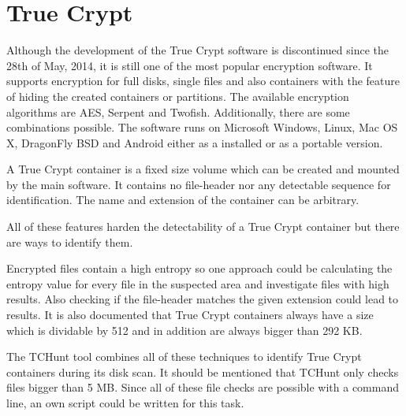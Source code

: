 \section{True Crypt}
Although the development of the True Crypt software is discontinued since the 28th of May, 2014, it is still one of the most popular encryption software.
It supports encryption for full disks, single files and also containers with the feature of hiding the created containers or partitions.
The available encryption algorithms are AES, Serpent and Twofish. Additionally, there are some combinations possible.
The software runs on Microsoft Windows, Linux, Mac OS X, DragonFly BSD and Android either as a installed or as a portable version.\cite{wiki:truecrypt}

A True Crypt container is a fixed size volume which can be created and mounted by the main software.
It contains no file-header nor any detectable sequence for identification.
The name and extension of the container can be arbitrary.

All of these features harden the detectability of a True Crypt container but there are ways to identify them.

Encrypted files contain a high entropy so one approach could be calculating the entropy value for every file in the suspected area and investigate files with high results.
Also checking if the file-header matches the given extension could lead to results.
It is also documented that True Crypt containers always have a size which is dividable by 512 and in addition are always bigger than 292 KB.\cite{truecrypt:sourceCode}

The TCHunt tool combines all of these techniques to identify True Crypt containers during its disk scan. It should be mentioned that TCHunt only checks files bigger than 5 MB.
Since all of these file checks are possible with a command line, an own script could be written for this task.
